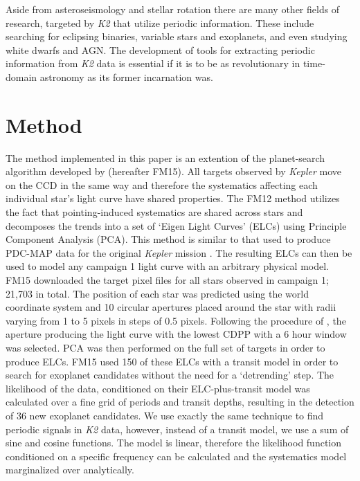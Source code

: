 \documentclass[useAMS, usenatbib]{aastex}
\begin{document}
Aside from asteroseismology and stellar rotation there are many other fields
of research, targeted by {\it K2} that utilize periodic information.
These include searching for eclipsing binaries, variable stars and exoplanets,
and even studying white dwarfs and AGN.
The development of tools for extracting periodic information from {\it K2}
data is essential if it is to be as revolutionary in time-domain
astronomy as its former incarnation was.

\section{Method}
\label{Method}

The method implemented in this paper is an extention of the planet-search
algorithm developed by \citet{Foreman-Mackey2015} (hereafter FM15).
All targets observed by {\it Kepler} move on the CCD in the same way and
therefore the systematics affecting each individual star's light curve have
shared properties.
The FM12 method utilizes the fact that pointing-induced systematics are shared
across stars and decomposes the trends into a set of `Eigen Light Curves'
(ELCs) using Principle Component Analysis (PCA).
This method is similar to that used to produce PDC-MAP data for the original
{\it Kepler} mission \citep[][]{Stumpe2012, Smith2012}.
The resulting ELCs can then be used to model any campaign 1 {\it }light
curve with an arbitrary physical model.
FM15 downloaded the target pixel files for all stars observed in campaign 1;
21,703 in total.
The position of each star was predicted using the world coordinate system and
10 circular apertures placed around the star with radii varying from 1 to
5 pixels in steps of 0.5 pixels.
Following the procedure of \citet{Vanderburg2014}, the aperture producing the
light curve with the lowest CDPP with a 6 hour window \citet{Christiansen2012}
was selected.
PCA was then performed on the full set of targets in order to produce ELCs.
FM15 used 150 of these ELCs with a transit model in order to
search for exoplanet candidates without the need for a `detrending' step.
The likelihood of the data, conditioned on their ELC-plus-transit
model was calculated over a fine grid of periods and transit depths, resulting
in the detection of 36 new exoplanet candidates.
We use exactly the same technique to find periodic signals in {\it K2} data,
however, instead of a transit model, we use a sum of sine and cosine functions.
The model is linear, therefore the likelihood function conditioned on
a specific frequency can be calculated and the systematics model marginalized
over analytically.
\end{document}
